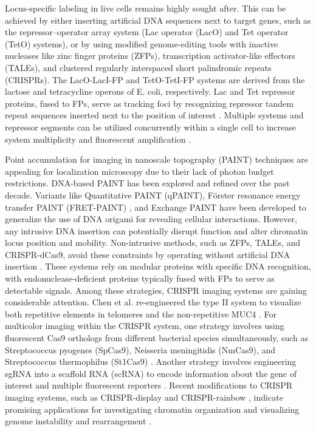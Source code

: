 Locus-specific labeling in live cells remains highly sought after. This can be achieved by either inserting artificial DNA sequences next to target genes, such as the repressor–operator array system (Lac operator (LacO) and Tet operator (TetO) systems), or by using modified genome-editing tools with inactive nucleases like zinc finger proteins (ZFPs), transcription activator-like effectors (TALEs), and clustered regularly interspaced short palindromic repeats (CRISPRs). The LacO-LacI-FP and TetO-TetI-FP systems are derived from the lactose and tetracycline operons of E. coli, respectively. Lac and Tet repressor proteins, fused to FPs, serve as tracking foci by recognizing repressor tandem repeat sequences inserted next to the position of interest \parencite{Ding2017,Loiodice2014}. Multiple systems and repressor segments can be utilized concurrently within a single cell to increase system multiplicity and fluorescent amplification \parencite{Backlund2014,Roukos2013,Tasan2018}.

Point accumulation for imaging in nanoscale topography (PAINT) techniques are appealing for localization microscopy due to their lack of photon budget restrictions. DNA-based PAINT \parencite{Jungmann2016} has been explored and refined over the past decade. Variants like Quantitative PAINT (qPAINT), Förster resonance energy transfer PAINT (FRET-PAINT) \parencite{Jungmann2016}, and Exchange PAINT have been developed to generalize the use of DNA origami for revealing cellular interactions. However, any intrusive DNA insertion can potentially disrupt function and alter chromatin locus position and mobility. Non-intrusive methods, such as ZFPs, TALEs, and CRISPR-dCas9, avoid these constraints by operating without artificial DNA insertion \parencite{Chen2016,Lindhout2007,Ma2013}. These systems rely on modular proteins with specific DNA recognition, with endonuclease-deficient proteins typically fused with FPs to serve as detectable signals. Among these strategies, CRISPR imaging systems are gaining considerable attention. Chen et al. re-engineered the type II system to visualize both repetitive elements in telomeres and the non-repetitive MUC4 \parencite{Chen2013}. For multicolor imaging within the CRISPR system, one strategy involves using fluorescent Cas9 orthologs from different bacterial species simultaneously, such as Streptococcus pyogenes (SpCas9), Neisseria meningitidis (NmCas9), and Streptococcus thermophilus (St1Cas9) \parencite{Ma2015}. Another strategy involves engineering sgRNA into a scaffold RNA (scRNA) to encode information about the gene of interest and multiple fluorescent reporters \parencite{Zalatan2015}. Recent modifications to CRISPR imaging systems, such as CRISPR-display \parencite{Shechner2015} and CRISPR-rainbow \parencite{Ma2016}, indicate promising applications for investigating chromatin organization and visualizing genome instability and rearrangement \parencite{Chen2016}.


